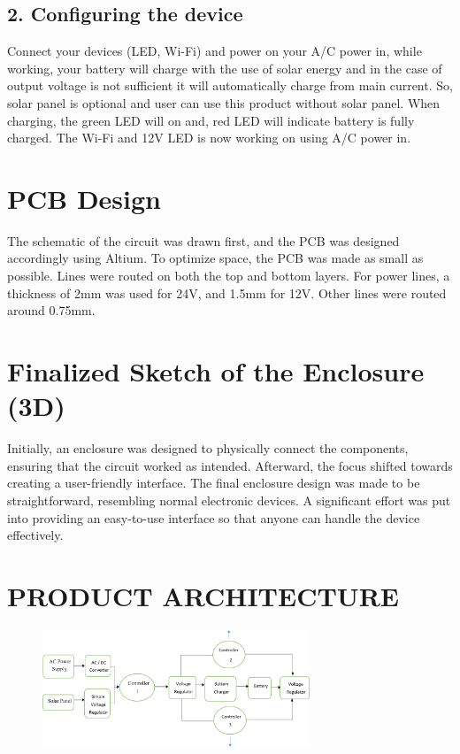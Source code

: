 \documentclass[twocolumn]{article}
\begin{document}
\subsection*{2. Configuring the device}
Connect your devices (LED, Wi-Fi) and power 
on your A/C power in, while working, your 
battery will charge with the use of solar energy 
and in the case of output voltage is not 
sufficient it will automatically charge from 
main current. So, solar panel is optional and 
user can use this product without solar panel.
When charging, the green LED will on and, red 
LED will indicate battery is fully charged.
The Wi-Fi and 12V LED is now working on 
using A/C power in.

\section*{PCB Design}
The schematic of the circuit was drawn first, and the PCB was designed accordingly using Altium. To optimize space, the PCB was made as small as possible. Lines were routed on both the top and bottom layers. For power lines, a thickness of 2mm was used for 24V, and 1.5mm for 12V. Other lines were routed around 0.75mm.

\section*{Finalized Sketch of the Enclosure (3D)}
Initially, an enclosure was designed to physically connect the components, ensuring that the circuit worked as intended. Afterward, the focus shifted towards creating a user-friendly interface. The final enclosure design was made to be straightforward, resembling normal electronic devices. A significant effort was put into providing an easy-to-use interface so that anyone can handle the device effectively.

\section*{PRODUCT ARCHITECTURE}

\begin{figure}[h]
    \centering
    \includegraphics[width = 8cm]{6.png}
    \label{fig:enter-label}
\end{figure}
\end{document}
